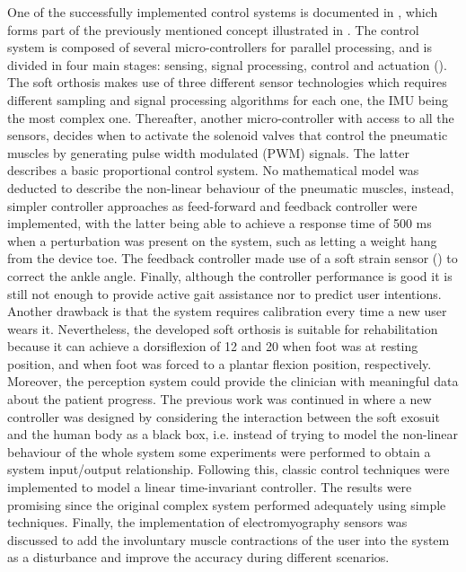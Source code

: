 One of the successfully implemented control systems is documented in \cite{park2011bio}, which forms part of the previously mentioned concept illustrated in . The control system is composed of several micro-controllers for parallel processing, and is divided in four main stages: sensing, signal processing, control and actuation (). The soft orthosis makes use of three different sensor technologies which requires different sampling and signal processing algorithms for each one, the IMU being the most complex one. Thereafter, another micro-controller with access to all the sensors, decides when to activate the solenoid valves that control the pneumatic muscles by generating pulse width modulated (PWM) signals. The latter describes a basic proportional control system. No mathematical model was deducted to describe the non-linear behaviour of the pneumatic muscles, instead, simpler controller approaches as feed-forward and feedback controller were implemented, with the latter being able to achieve a response time of 500 ms when a perturbation was present on the system, such as letting a weight hang from the device toe. The feedback controller made use of a soft strain sensor () to correct the ankle angle. Finally, although the controller performance is good it is still not enough to provide active gait assistance nor to predict user intentions. Another drawback is that the system requires calibration every time a new user wears it. Nevertheless, the developed soft orthosis is suitable for rehabilitation because it can achieve a dorsiflexion of 12\textdegree{} and 20\textdegree{} when foot was at resting position, and when foot was forced to a plantar flexion position, respectively. Moreover, the perception system could provide the clinician with meaningful data about the patient progress. The previous work was continued in \cite{park2014design} where a new controller was designed by considering the interaction between the soft exosuit and the human body as a black box, i.e. instead of trying to model the non-linear behaviour of the whole system some experiments were performed to obtain a system input/output relationship. Following this, classic control techniques were implemented to model a linear time-invariant controller. The results were promising since the original complex system performed adequately using simple techniques. Finally, the implementation of electromyography sensors was discussed to add the involuntary muscle contractions of the user into the system as a disturbance and improve the accuracy during different scenarios.

